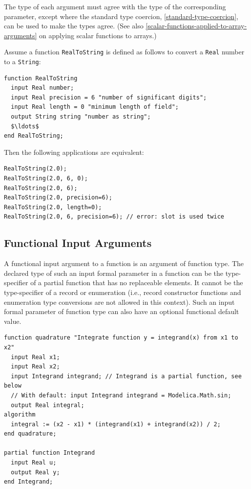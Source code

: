The type of each argument must agree with the type of the corresponding parameter, except where the standard type coercion, \cref{standard-type-coercion}, can be used to make the types agree.
(See also \cref{scalar-functions-applied-to-array-arguments} on applying scalar functions to arrays.)

\begin{example}
Assume a function \lstinline!RealToString! is defined as follows to convert a \lstinline!Real! number to a \lstinline!String!:
\begin{lstlisting}[language=modelica]
function RealToString
  input Real number;
  input Real precision = 6 "number of significant digits";
  input Real length = 0 "minimum length of field";
  output String string "number as string";
  $\ldots$
end RealToString;
\end{lstlisting}
Then the following applications are equivalent:
\begin{lstlisting}[language=modelica]
RealToString(2.0);
RealToString(2.0, 6, 0);
RealToString(2.0, 6);
RealToString(2.0, precision=6);
RealToString(2.0, length=0);
RealToString(2.0, 6, precision=6); // error: slot is used twice
\end{lstlisting}
\end{example}

\subsection{Functional Input Arguments}\label{functional-input-arguments-to-functions}

A functional input argument to a function is an argument of function type.
The declared type of such an input formal parameter in a function can be the type-specifier of a partial function that has no replaceable elements.
It cannot be the type-specifier of a record or enumeration (i.e., record constructor functions and enumeration type conversions are not allowed in this context).
Such an input formal parameter of function type can also have an optional functional default value.

\begin{example}
\begin{lstlisting}[language=modelica]
function quadrature "Integrate function y = integrand(x) from x1 to x2"
  input Real x1;
  input Real x2;
  input Integrand integrand; // Integrand is a partial function, see below
  // With default: input Integrand integrand = Modelica.Math.sin;
  output Real integral;
algorithm
  integral := (x2 - x1) * (integrand(x1) + integrand(x2)) / 2;
end quadrature;

partial function Integrand
  input Real u;
  output Real y;
end Integrand;
\end{lstlisting}
\end{example}

